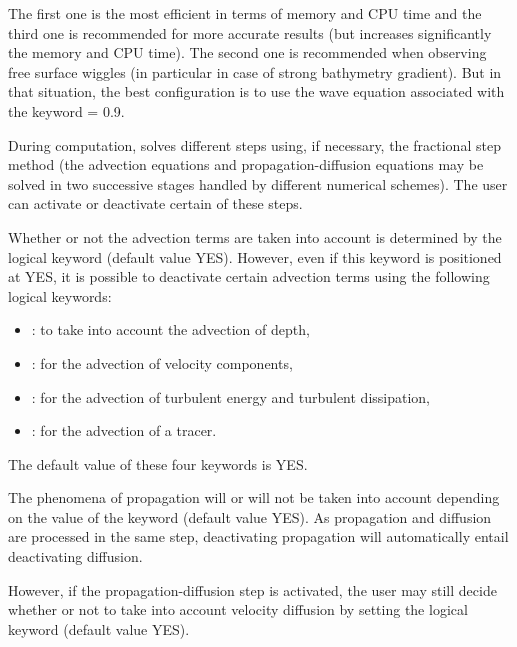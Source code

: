 The first one is the most efficient in terms of memory and CPU time and the third one is recommended for more accurate results (but increases significantly the memory and CPU time). The second one is recommended when observing free surface wiggles (in particular in case of strong bathymetry gradient). But in that situation, the best configuration is to use the wave equation associated with the keyword  = 0.9.

 During computation,  solves different steps using, if necessary, the fractional step method (the advection equations and propagation-diffusion equations may be solved in two successive stages handled by different numerical schemes). The user can activate or deactivate certain of these steps.

 Whether or not the advection terms are taken into account is determined by the logical keyword  (default value YES). However, even if this keyword is positioned at YES, it is possible to deactivate certain advection terms using the following logical keywords:

\begin{itemize}
\item  {}: to take into account the advection of depth,

\item  {} : for the advection of velocity components,

\item  {} : for the advection of turbulent energy and turbulent dissipation,

\item  {} : for the advection of a tracer.
\end{itemize}

 The default value of these four keywords is YES.

 The phenomena of propagation will or will not be taken into account depending on the value of the keyword   (default value YES). As propagation and diffusion are processed in the same step, deactivating propagation will automatically entail deactivating diffusion.

 However, if the propagation-diffusion step is activated, the user may still decide whether or not to take into account velocity diffusion by setting the logical keyword   (default value YES).

